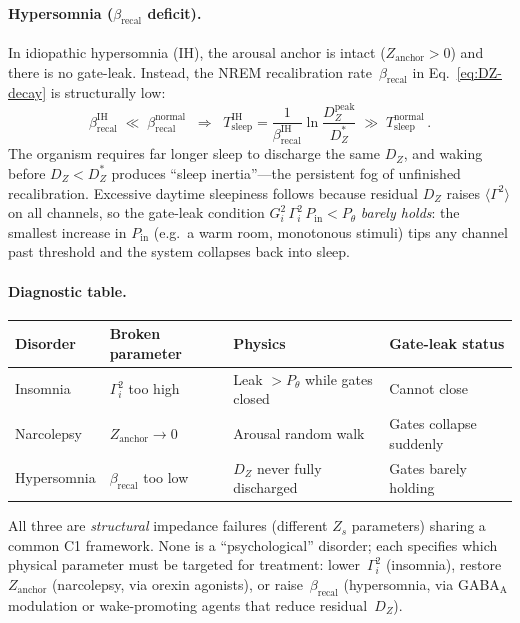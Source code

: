 \documentclass[aps,pre,twocolumn,superscriptaddress,floatfix]{revtex4-2}
\begin{document}
\paragraph{Hypersomnia ($\beta_{\mathrm{recal}}$ deficit).}
In idiopathic hypersomnia (IH), the arousal anchor
is intact ($Z_{\mathrm{anchor}} > 0$) and there is
no gate-leak.
Instead, the NREM recalibration rate~$\beta_{\mathrm{recal}}$
in Eq.~\eqref{eq:DZ-decay} is structurally low:
\begin{equation}
  \beta_{\mathrm{recal}}^{\text{IH}}
  \;\ll\;
  \beta_{\mathrm{recal}}^{\text{normal}}
  \;\;\Longrightarrow\;\;
  T_{\mathrm{sleep}}^{\text{IH}}
  = \frac{1}{\beta_{\mathrm{recal}}^{\text{IH}}}
    \ln\!\frac{D_Z^{\mathrm{peak}}}{D_Z^*}
  \;\gg\; T_{\mathrm{sleep}}^{\text{normal}}\,.
  \label{eq:hypersomnia}
\end{equation}
The organism requires far longer sleep to discharge the
same $D_Z$, and waking before $D_Z < D_Z^*$
produces ``sleep inertia''---the persistent
fog of unfinished recalibration.
Excessive daytime sleepiness follows because
residual $D_Z$ raises $\langle\Gamma^2\rangle$
on all channels, so the gate-leak condition
$G_i^2\,\Gamma_i^2\,P_{\mathrm{in}} < P_\theta$
\emph{barely holds}: the smallest increase in
$P_{\mathrm{in}}$ (e.g.\ a warm room, monotonous
stimuli) tips any channel past threshold and the
system collapses back into sleep.

\paragraph{Diagnostic table.}
\begin{center}
\begin{tabular}{@{}llll@{}}
\hline
Disorder & Broken parameter & Physics
  & Gate-leak status \\
\hline
Insomnia
  & $\Gamma_i^2$ too high
  & Leak $> P_\theta$ while gates closed
  & Cannot close \\
Narcolepsy
  & $Z_{\mathrm{anchor}} \to 0$
  & Arousal random walk
  & Gates collapse suddenly \\
Hypersomnia
  & $\beta_{\mathrm{recal}}$ too low
  & $D_Z$ never fully discharged
  & Gates barely holding \\
\hline
\end{tabular}
\end{center}

\noindent
All three are \emph{structural} impedance failures
(different $Z_s$ parameters) sharing a common
C1 framework.
None is a ``psychological'' disorder;
each specifies which physical parameter must be
targeted for treatment: lower~$\Gamma_i^2$
(insomnia), restore~$Z_{\mathrm{anchor}}$
(narcolepsy, via orexin agonists),
or raise~$\beta_{\mathrm{recal}}$
(hypersomnia, via GABA$_\text{A}$ modulation or
wake-promoting agents that reduce residual~$D_Z$).
\end{document}
